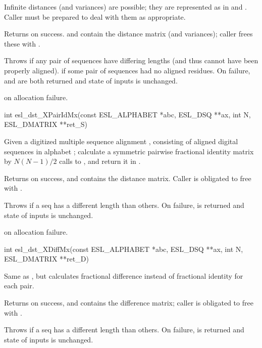 \begin{sreapi}
Infinite distances (and variances) are possible; they
are represented as  in  and . Caller must
be prepared to deal with them as appropriate.

Returns  on success.  and  contain the
distance matrix (and variances); caller frees these with
. 

Throws  if any pair of sequences have differing lengths
(and thus cannot have been properly aligned). 
 if some pair of sequences had no aligned
residues. On failure,  and  are both returned 
and state of inputs is unchanged.

 on allocation failure.


\hypertarget{func:esl_dst_XPairIdMx()}
{\item[int esl\_dst\_XPairIdMx(const ESL\_ALPHABET *abc,  ESL\_DSQ **ax, int N, ESL\_DMATRIX **ret\_S)]}

Given a digitized multiple sequence alignment , consisting
of  aligned digital sequences in alphabet ; calculate
a symmetric pairwise fractional identity matrix by $N(N-1)/2$
calls to , and return it in .

Returns  on success, and  contains the distance
matrix. Caller is obligated to free  with 
. 

Throws  if a seq has a different
length than others. On failure,  is returned 
and state of inputs is unchanged.

 on allocation failure.


\hypertarget{func:esl_dst_XDiffMx()}
{\item[int esl\_dst\_XDiffMx(const ESL\_ALPHABET *abc, ESL\_DSQ **ax, int N, ESL\_DMATRIX **ret\_D)]}

Same as , but calculates fractional
difference  instead of fractional identity  for
each pair.

Returns  on success, and  contains the difference
matrix; caller is obligated to free  with 
. 

Throws  if a seq has a different
length than others. On failure,  is returned 
and state of inputs is unchanged.



\end{sreapi}

